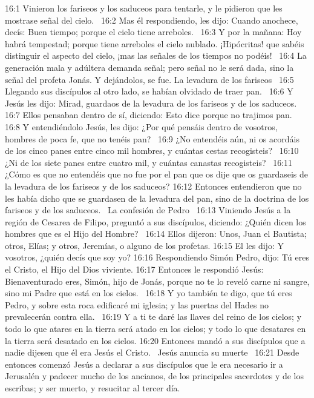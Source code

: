 16:1 Vinieron los fariseos y los saduceos para tentarle, y le pidieron que les mostrase señal del cielo.  
16:2 Mas él respondiendo, les dijo: Cuando anochece, decís: Buen tiempo; porque el cielo tiene arreboles.  
16:3 Y por la mañana: Hoy habrá tempestad; porque tiene arreboles el cielo nublado. ¡Hipócritas! que sabéis distinguir el aspecto del cielo, ¡mas las señales de los tiempos no podéis!  
16:4 La generación mala y adúltera demanda señal; pero señal no le será dada, sino la señal del profeta Jonás. Y dejándolos, se fue. 
La levadura de los fariseos  
16:5 Llegando sus discípulos al otro lado, se habían olvidado de traer pan.  
16:6 Y Jesús les dijo: Mirad, guardaos de la levadura de los fariseos y de los saduceos. 
16:7 Ellos pensaban dentro de sí, diciendo: Esto dice porque no trajimos pan.  
16:8 Y entendiéndolo Jesús, les dijo: ¿Por qué pensáis dentro de vosotros, hombres de poca fe, que no tenéis pan?  
16:9 ¿No entendéis aún, ni os acordáis de los cinco panes entre cinco mil hombres, y cuántas cestas recogisteis?  
16:10 ¿Ni de los siete panes entre cuatro mil, y cuántas canastas recogisteis?  
16:11 ¿Cómo es que no entendéis que no fue por el pan que os dije que os guardaseis de la levadura de los fariseos y de los saduceos? 
16:12 Entonces entendieron que no les había dicho que se guardasen de la levadura del pan, sino de la doctrina de los fariseos y de los saduceos.  
La confesión de Pedro   
16:13 Viniendo Jesús a la región de Cesarea de Filipo, preguntó a sus discípulos, diciendo: ¿Quién dicen los hombres que es el Hijo del Hombre?  
16:14 Ellos dijeron: Unos, Juan el Bautista; otros, Elías; y otros, Jeremías, o alguno de los profetas. 
16:15 El les dijo: Y vosotros, ¿quién decís que soy yo? 
16:16 Respondiendo Simón Pedro, dijo: Tú eres el Cristo, el Hijo del Dios viviente. 
16:17 Entonces le respondió Jesús: Bienaventurado eres, Simón, hijo de Jonás, porque no te lo reveló carne ni sangre, sino mi Padre que está en los cielos.  
16:18 Y yo también te digo, que tú eres Pedro, y sobre esta roca edificaré mi iglesia; y las puertas del Hades no prevalecerán contra ella.  
16:19 Y a ti te daré las llaves del reino de los cielos; y todo lo que atares en la tierra será atado en los cielos; y todo lo que desatares en la tierra será desatado en los cielos. 
16:20 Entonces mandó a sus discípulos que a nadie dijesen que él era Jesús el Cristo.  
Jesús anuncia su muerte   
16:21 Desde entonces comenzó Jesús a declarar a sus discípulos que le era necesario ir a Jerusalén y padecer mucho de los ancianos, de los principales sacerdotes y de los escribas; y ser muerto, y resucitar al tercer día.  
